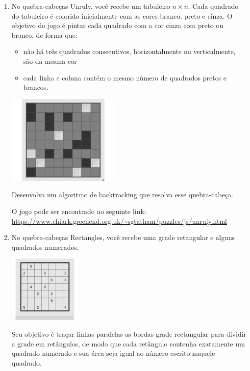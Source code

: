 \begin{enumerate}
\item 

No quebra-cabeças Unruly, você recebe um tabuleiro $n \times n$. Cada quadrado do tabuleiro é colorido inicialmente com as cores branco, preto e cinza. O objetivo do jogo é pintar cada quadrado com a cor cinza com preto ou branco, de forma que:

\begin{itemize}
    \item não há três quadrados consecutivos, horizontalmente ou verticalmente, são da mesma cor
    \item cada linha e coluna contém o mesmo número de quadrados pretos e brancos. 
\end{itemize}

\begin{center}
\includegraphics[scale=0.8]{images/unruly.png} 
\end{center}

Desenvolva um algoritmo de backtracking que resolva esse quebra-cabeça.

O jogo pode ser encontrado no seguinte link: \url{https://www.chiark.greenend.org.uk/~sgtatham/puzzles/js/unruly.html}

\item No quebra-cabeças Rectangles, você recebe uma grade retangular e alguns quadrados numerados.

\begin{center}
\includegraphics[scale=1.0]{images/Rectangles.png} 
\end{center}

Seu objetivo é traçar linhas paralelas as bordas grade rectangular para dividir a grade em retângulos, de modo que cada retângulo contenha exatamente um quadrado numerado e sua área seja igual ao número escrito naquele quadrado.


\end{enumerate}
